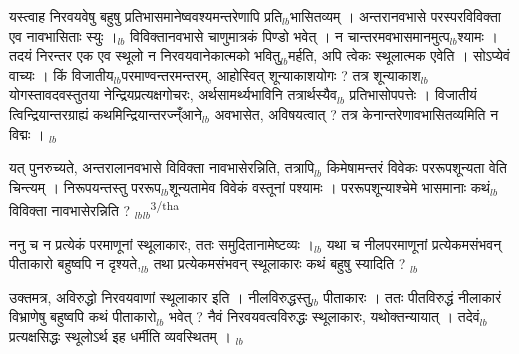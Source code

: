 \documentclass[article,12pt,a4paper]{memoir}%
\newcounter{parCount}
\begin{document}
	  \pstart \leavevmode%
	यस्त्वाह निरवयवेषु बहुषु प्रतिभासमानेष्ववश्यमन्तरेणापि प्रति{\tiny $_{lb}$}भासितव्यम् । अन्तरानवभासे परस्परविविक्ता एव नावभासिताः स्युः ।{\tiny $_{lb}$} विविक्तानवभासे चाणुमात्रकं पिण्डो भवेत् । न चान्तरमवभासमानमुत्प{\tiny $_{lb}$}श्यामः । तदयं निरन्तर एक एव स्थूलो न निरवयवानेकात्मको भवितु{\tiny $_{lb}$}मर्हति, अपि त्वेकः स्थूलात्मक एवेति । सोऽप्येवं वाच्यः । किं विजातीय{\tiny $_{lb}$}परमाण्वन्तरमन्तरम्, आहोस्वित् शून्याकाशयोगः ? तत्र शून्याकाश{\tiny $_{lb}$}योगस्तावदवस्तुतया नेन्द्रियप्रत्यक्षगोचरः, अर्थसामर्थ्यभाविनि तत्रार्थस्यैव{\tiny $_{lb}$} प्रतिभासोपपत्तेः । विजातीयं त्विन्द्रियान्तरग्राह्यं कथमिन्द्रियान्तरज्न्ँआने{\tiny $_{lb}$} अवभासेत, अविषयत्वात् ? तत्र केनान्तरेणावभासितव्यमिति न विद्मः ।
	{}
	\pend%
      {\tiny $_{lb}$}

	  \pstart \leavevmode%
	यत् पुनरुच्यते, अन्तरालानवभासे विविक्ता नावभासेरन्निति, तत्रापि{\tiny $_{lb}$} किमेषामन्तरं विवेकः पररूपशून्यता वेति चिन्त्यम् । निरूपयन्तस्तु पररूप{\tiny $_{lb}$}शून्यतामेव विवेकं वस्तूनां पश्यामः । पररूपशून्याश्चेमे भासमानाः कथं{\tiny $_{lb}$} विविक्ता नावभासेरन्निति ?
	{}
	\pend%
      {\tiny $_{lb}$}{\tiny $_{lb}$}\textsuperscript{\textenglish{3/tha}}

	  \pstart \leavevmode%
	ननु च न प्रत्येकं परमाणूनां स्थूलाकारः, ततः समुदितानामेष्टव्यः ।{\tiny $_{lb}$} यथा च नीलपरमाणूनां प्रत्येकमसंभवन् पीताकारो बहुष्वपि न दृश्यते,{\tiny $_{lb}$} तथा प्रत्येकमसंभवन् स्थूलाकारः कथं बहुषु स्यादिति ?
	{}
	\pend%
      {\tiny $_{lb}$}

	  \pstart \leavevmode%
	उक्तमत्र, अविरुद्धो निरवयवाणां स्थूलाकार इति । नीलविरुद्धस्तु{\tiny $_{lb}$} पीताकारः । ततः पीतविरुद्धं नीलाकारं विभ्राणेषु बहुष्वपि कथं पीताकारो{\tiny $_{lb}$} भवेत् ? नैवं निरवयवत्वविरुद्धः स्थूलाकारः, यथोक्तन्यायात् । तदेवं{\tiny $_{lb}$} प्रत्यक्षसिद्धः स्थूलोऽर्थ इह धर्मीति व्यवस्थितम् ।
	{}
	\pend%
      {\tiny $_{lb}$}
\end{document}
